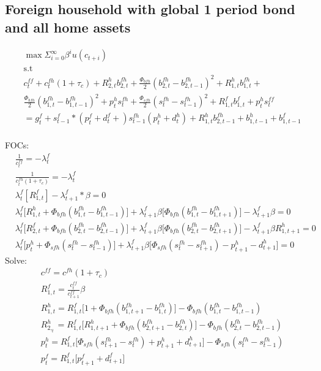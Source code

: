 \documentclass[a4paper]{article}
\begin{document}
\subsection{Foreign household with global 1 period bond and all home assets}
\begin{align*}
&\max \Sigma_{i=0}^\infty \beta^i u(c_{t+i})\\ &\text{s.t}\\
&c^{ff}_t+c^{fh}_t(1+\tau_c)+R^h_{2,t} b^{fh}_{2,t} + \frac{\Phi_{bfh}}{2}(b^{fh}_{2,t}-b^{fh}_{2,t-1})^2 +
R^h_{1,t} b^{fh}_{1,t} + \\ 
&\frac{\Phi_{bfh}}{2}(b^{fh}_{1,t}-b^{fh}_{1,t-1})^2 + p^{h}_t s^{fh}_t+\frac{\Phi_{sfh}}{2}(s^{fh}_t-s^{fh}_{t-1})^2+R^f_{1,t}b^f_{1,t}+p^h_t s^{ff}_t\\&=g^f_t+s^f_{t-1}*(p^f_t+d^f_t+)s^{fh}_{t-1}(p^{h}_t+d^{h}_t)+R^{h}_{1,t}b^{fh}_{2,t-1}+b^h_{1,t-1}+b^f_{1,t-1}\\
\end{align*}


FOCs:
\begin{align*}
&\frac{1}{c^{ff}_t}=-\lambda^f_t\\
&\frac{1}{c^{fh}_t(1+\tau_c)}=-\lambda^f_t \\
&\lambda^f_t [R^f_{1,t}]-\lambda^f_{t+1}*\beta=0\\
&\lambda^f_t\big[R^h_{1,t}+\Phi_{bfh} (b^{fh}_{1,t}-b^{fh}_{1,t-1})\big ]+ \lambda^f_{t+1} \beta \big[\Phi_{bfh} (b^{fh}_{1,t} - b^{fh}_{1,t+1})]-\lambda^f_{t+1}\beta =0\\
&\lambda^f_t\big[R^f_{2,t}+\Phi_{bfh} (b^{fh}_{2,t}-b^{fh}_{2,t-1})\big ]+ \lambda^f_{t+1} \beta \big[\Phi_{bfh} (b^{fh}_{2,t} - b^{fh}_{2,t+1})]-\lambda^f_{t+1}\beta R^{h}_{1,t+1}=0\\
&\lambda^f_t \big[p^{h}_t + \Phi_{sfh} (s^{fh}_t-s^{fh}_{t-1})\big] + \lambda^f_{t+1} \beta \big[\Phi_{sfh}  (s^{fh}_t-s^{fh}_{t+1}) - p^{h}_{t+1}-d^{h}_{t+1}\big]=0
\end{align*}
Solve:
\begin{align}
&c^{ff}=c^{fh}(1+\tau_c)\\
&R^f_{1,t}=\frac{c^{ff}_t}{c^{ff}_{t+1}}\beta\\
&R^h_{1,t}=R^f_{1,t} \big[1+\Phi_{bfh} (b^{fh}_{1,t+1} - b^{fh}_{1,t})\big] -\Phi_{bfh} (b^{fh}_{1,t}-b^{fh}_{1,t-1})\\
&R^h_{2,_t}=R^f_{1,t} \big[R^{h}_{1,t+1}+\Phi_{bfh} (b^{fh}_{2,t+1} - b^{fh}_{2,t})\big] -\Phi_{bfh} (b^{fh}_{2,t}-b^{fh}_{2,t-1})\\
&p^{h}_t=R^f_{1,t} \big[ \Phi_{sfh} (s^{fh}_{t+1}-s^{fh}_t)+p^{h}_{t+1}+d^{h}_{t+1} \big] - \Phi_{sfh} (s^{fh}_t - s^{fh}_{t-1})\\
&p^f_t=R^f_{1,t}\big[p^f_{t+1}+d^f_{t+1}\big]
\end{align}
\end{document}
